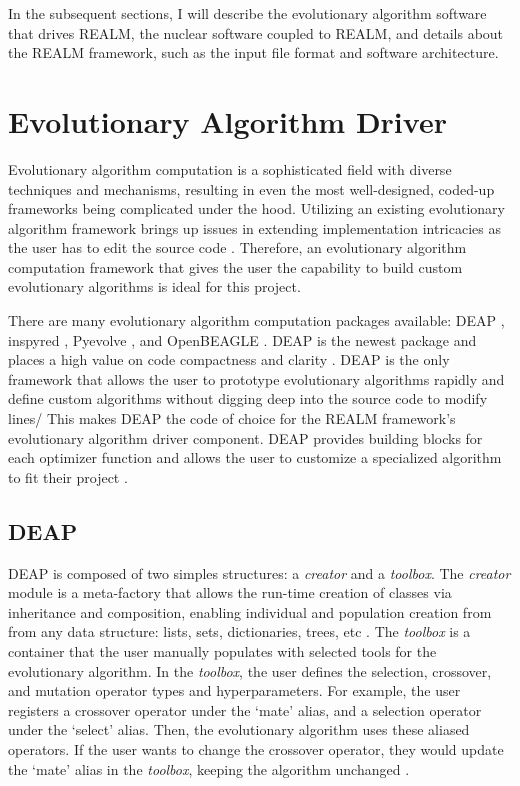 In the subsequent sections, I will describe the evolutionary algorithm software 
that drives \gls{REALM}, the nuclear software coupled to REALM, and details about 
the \gls{REALM} framework, such as the input file format and software architecture. 

\section{Evolutionary Algorithm Driver}
Evolutionary algorithm computation is a sophisticated field with diverse techniques 
and mechanisms, resulting in even the most well-designed, coded-up frameworks 
being complicated under the hood. 
Utilizing an existing evolutionary algorithm framework brings 
up issues in extending implementation intricacies as the user has to edit the 
source code \cite{fortin_deap_2012}. 
Therefore, an evolutionary algorithm computation framework that gives the user the 
capability to build custom evolutionary algorithms is ideal for this project.

There are many evolutionary algorithm computation packages available: 
\gls{DEAP} \cite{fortin_deap_2012}, inspyred \cite{garrett_inspyred_2014}, 
Pyevolve \cite{perone_pyevolve_2009}, and OpenBEAGLE \cite{gagne_open_2002}.
\gls{DEAP} is the newest package and places a high value on code 
compactness and clarity \cite{fortin_deap_2012}. 
\gls{DEAP} is the only framework that allows the user to prototype evolutionary 
algorithms rapidly and define custom algorithms without digging deep into 
the source code to modify lines/
This makes \gls{DEAP} the code of choice for the REALM framework's evolutionary 
algorithm driver component. 
\gls{DEAP} provides building blocks for each optimizer function and allows the 
user to customize a specialized algorithm to fit their project \cite{fortin_deap_2012}.

\subsection{\acrlong{DEAP}}
\label{sec:deap-works}
\gls{DEAP} is composed of two simples structures: a \textit{creator} and a 
\textit{toolbox}.  
The \textit{creator} module is a meta-factory that allows the run-time creation 
of classes via inheritance and composition, enabling individual and population 
creation from  from any data structure: lists, sets, dictionaries, trees, 
etc \cite{fortin_deap_2012}. 
The \textit{toolbox} is a container that the user manually populates with 
selected tools for the evolutionary algorithm.
In the \textit{toolbox}, the user defines the selection, crossover, and 
mutation operator types and hyperparameters. 
For example, the user registers a crossover operator under the `mate'
alias, and a selection operator under the `select' alias. 
Then, the evolutionary algorithm uses these aliased operators. 
If the user wants to change the crossover operator, they would update the 
`mate' alias in the \textit{toolbox}, keeping the algorithm unchanged
\cite{fortin_deap_2012}. 

